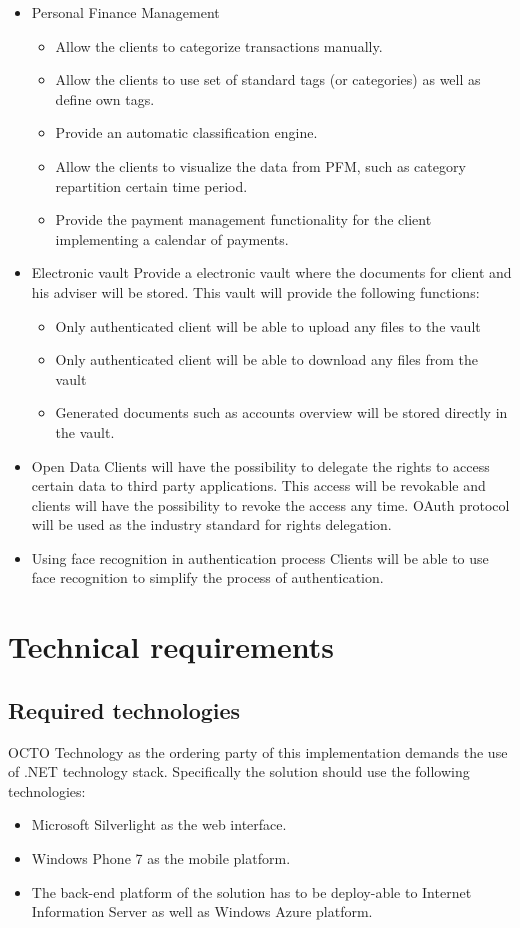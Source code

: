 \begin{itemize}
	\item  Personal Finance Management
	\begin{itemize}
		\item Allow the clients to categorize transactions manually.
		\item Allow the clients to use set of standard tags (or categories) as well as define own tags.
		\item Provide an automatic classification engine.
		\item Allow the clients to visualize the data from PFM, such as category repartition certain time period.
		\item Provide the payment management functionality for the client implementing a calendar of payments.
	\end{itemize}
	\item  Electronic vault
	Provide a electronic vault where the documents for client and his adviser will be stored. This vault will provide the following functions:
	\begin{itemize}
		\item  Only authenticated client will be able to upload any files to the vault
		\item  Only authenticated client will be able to download any files from the vault
		\item  Generated documents such as accounts overview will be stored directly in the vault.
	\end{itemize}
	\item Open Data
	Clients will have the possibility to delegate the rights to access certain data to third party applications.
	This access will be revokable and clients will have the possibility to revoke the access any time. OAuth protocol will be used as the industry standard for rights delegation.
	\item  Using face recognition in authentication process
	Clients will be able to use face recognition to simplify the process of authentication.
\end{itemize}

\section{Technical requirements}

\subsection{Required technologies}
OCTO Technology as the ordering party of this implementation demands the use of .NET technology stack. Specifically the solution should use the following technologies:
\begin{itemize}
	\item  Microsoft Silverlight as the web interface.
	\item  Windows Phone 7 as the mobile platform.
	\item  The back-end platform of the solution has to be deploy-able to Internet Information Server as well as Windows Azure platform.
\end{itemize}

